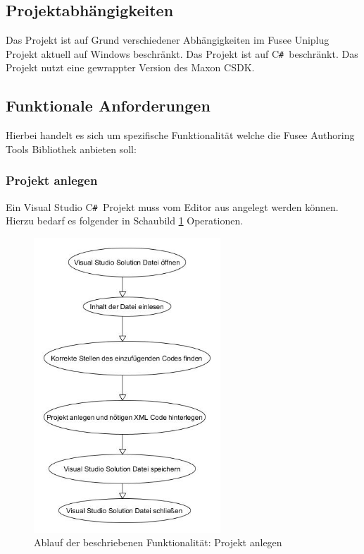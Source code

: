 \documentclass[pagesize, paper=a4, fontsize=12pt, titlepage=true, headings=small, headnosepline, abstractoff, liststotoc, nochapterprefix, plainheadsepline, twoside]{scrreprt}
\newcommand{\CSS}{C\texttt{\# }}
\newcommand{\CPP}{C\nolinebreak\hspace{-.05em}\raisebox{.4ex}{\tiny\bf +}\nolinebreak\hspace{-.10em}\raisebox{.4ex}{\tiny\bf +}}
\begin{document}
\subsection{Projektabhängigkeiten}
Das Projekt ist auf Grund verschiedener Abhängigkeiten im Fusee  Uniplug Projekt aktuell auf Windows beschränkt.
Das Projekt ist auf \CSS beschränkt.
Das Projekt nutzt eine gewrappter Version des Maxon \CPP SDK.

\subsection{Funktionale Anforderungen}
Hierbei handelt es sich um spezifische Funktionalität welche die Fusee Authoring Tools Bibliothek anbieten soll:

\subsubsection{Projekt anlegen}
Ein Visual Studio \CSS Projekt muss vom Editor aus angelegt werden können. Hierzu bedarf es folgender in Schaubild \ref{re:projektanlegen} Operationen. 

\begin{figure}[ht]
	\centering
	\includegraphics[width=7cm]{Bilder/ProjektAnlegen.jpg}
	\caption{Ablauf der beschriebenen Funktionalität: Projekt anlegen}
	\label{re:projektanlegen}
\end{figure}
\end{document}
